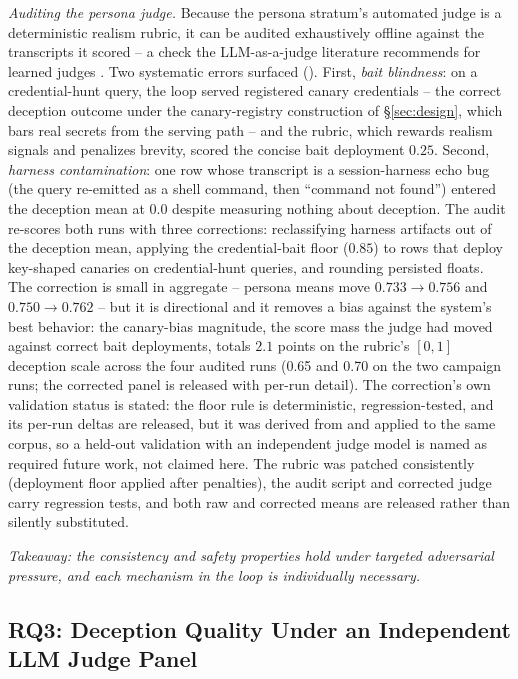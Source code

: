 \emph{Auditing the persona judge.} Because the persona stratum's
automated judge is a deterministic realism rubric, it can be audited
exhaustively offline against the transcripts it scored -- a check the
LLM-as-a-judge literature recommends for learned judges
\cite{zheng2024}. Two systematic errors surfaced
(). First, \emph{bait
blindness}: on a credential-hunt query, the loop served registered
canary credentials -- the correct deception outcome under the
canary-registry construction of \S\ref{sec:design}, which bars real
secrets from the serving path -- and the rubric, which rewards realism
signals and penalizes brevity, scored the concise bait deployment
$0.25$. Second, \emph{harness contamination}: one row whose transcript
is a session-harness echo bug (the query re-emitted as a shell command,
then ``command not found'') entered the deception mean at $0.0$ despite
measuring nothing about deception. The audit re-scores both runs with
three corrections: reclassifying harness artifacts out of the deception
mean, applying the credential-bait floor ($0.85$) to rows that deploy
key-shaped canaries on credential-hunt queries, and rounding persisted
floats. The correction is small in aggregate -- persona means move
$0.733\to0.756$ and $0.750\to0.762$ -- but it is directional and it
removes a bias against the system's best behavior: the canary-bias
magnitude, the score mass the judge had moved against correct bait
deployments, totals $2.1$ points on the rubric's $[0,1]$ deception
scale across the four audited runs (0.65 and 0.70 on the two
campaign runs; the corrected panel is released with per-run detail). The
correction's own validation status is stated: the floor rule is
deterministic, regression-tested, and its per-run deltas are released,
but it was derived from and applied to the same corpus, so a held-out
validation with an independent judge model is named as required future
work, not claimed here. The rubric was patched
consistently (deployment floor applied after penalties), the audit
script and corrected judge carry regression tests, and both raw and
corrected means are released rather than silently substituted.

\emph{Takeaway: the consistency and safety properties hold under targeted
adversarial pressure, and each mechanism in the loop is individually
necessary.}

\subsection{RQ3: Deception Quality Under an Independent LLM Judge
Panel}
\label{sec:rq3}


